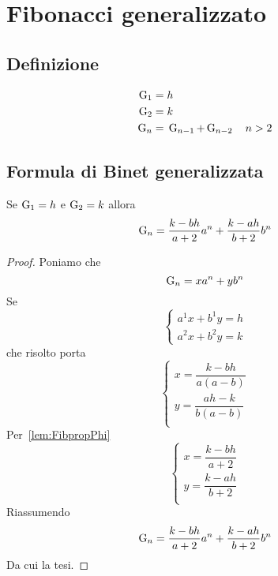 \chapter{Fibonacci generalizzato}
\section{Definizione}
\begin{defn}
	\begin{align}
		\operatorname{G}_{1}={}&h\notag\\
		\operatorname{G}_{2}={}&k\notag\\
		\operatorname{G}_{n}={}&\operatorname{G}_{n-1}+\operatorname{G}_{n-2}\quad n>2\label{eqn:FiboGendef}
	\end{align}
\end{defn}
\section{Formula di Binet generalizzata}
\begin{thm}
Se $\operatorname{G}_{1}={}h$ e $\operatorname{G}_{2}={}k$ allora \begin{equation}
	\operatorname{G}_{n}={}\dfrac{k-bh}{a+2}a^n+\dfrac{k-ah}{b+2}b^n
\end{equation}\label{eqn:FormulaBinetgeneralizzata}
\end{thm}
\begin{proof}
Poniamo che \begin{equation}
	\operatorname{G}_{n}=xa^n+yb^n
\end{equation} Se
\begin{equation*}
	\left\{
	\begin{array}{l}
		a^1x+b^1y=h\\ a^2x+b^2y=k
	\end{array}
	\right.
\end{equation*}
che risolto porta
\begin{equation*}
	\left\{
	\begin{array}{l}
		x=\dfrac{k-bh}{a(a-b)}\\y=\dfrac{ah-k}{b(a-b)}\\
	\end{array}
	\right.
\end{equation*}
Per~\vref{lem:FibpropPhi}
\begin{equation*}
	\left\{
	\begin{array}{l}
		x=\dfrac{k-bh}{a+2}\\y=\dfrac{k-ah}{b+2}\\
	\end{array}
	\right.
\end{equation*}
Riassumendo
 \begin{equation*}
	\operatorname{G}_{n}={}\dfrac{k-bh}{a+2}a^n+\dfrac{k-ah}{b+2}b^n
\end{equation*}
Da cui la tesi.
\end{proof}
